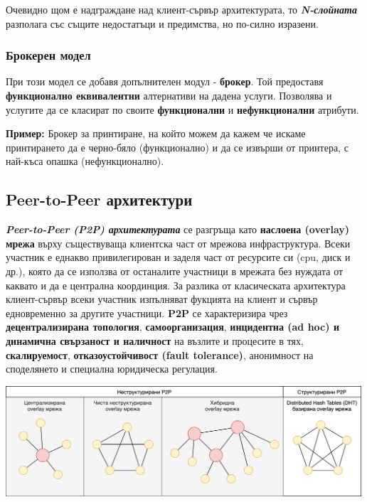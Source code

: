 \documentclass[fleqn,12pt]{article}
\begin{document}
Очевидно щом е надграждане над клиент-сървър архитектурата, то \textbf{\textit{N-слойната}} разполага със същите недостатъци и предимства, но по-силно изразени.

\subsubsection{Брокерен модел}
При този модел се добавя допълнителен модул - \textbf{брокер}.
Той предоставя \textbf{функционално еквивалентни} алтернативи на дадена услуги. 
Позволява и услугите да се класират по своите \textbf{функционални} и \textbf{нефункционални} атрибути.

\textbf{Пример: } Брокер за принтиране, на който можем да кажем че искаме принтирането да е черно-бяло (функционално) 
и да се извърши от принтера, с най-къса опашка (нефункционално).

\subsection{Peer-to-Peer архитектури}

\textbf{\textit{Peer-to-Peer (P2P) архитектурата}} се разгръща като \textbf{наслоена (overlay) мрежа} върху съществуваща клиентска част от мрежова инфраструктура.
Всеки участник е еднакво привилегирован и заделя част от ресурсите си (cpu, диск и др.), която да се използва от останалите участници в мрежата без нуждата от каквато и да е централна координция.
За разлика от класическата архитектура клиент-сървър всеки участник изпълняват фукцията на клиент и сървър едновременно за другите участници.
\textbf{P2P} се характеризира чрез \textbf{децентрализирана топология}, \textbf{самоорганизация}, \textbf{инцидентна (ad hoc) и динамична свързаност и наличност} на възлите и процесите в тях, \textbf{скалируемост}, \textbf{отказоустойчивост (fault tolerance)}, анонимност на споделянето и специална юридическа регулация.

\begin{center} \includegraphics[width=500px]{p2p_overlay_topologies.png} \end{center}
\end{document}
